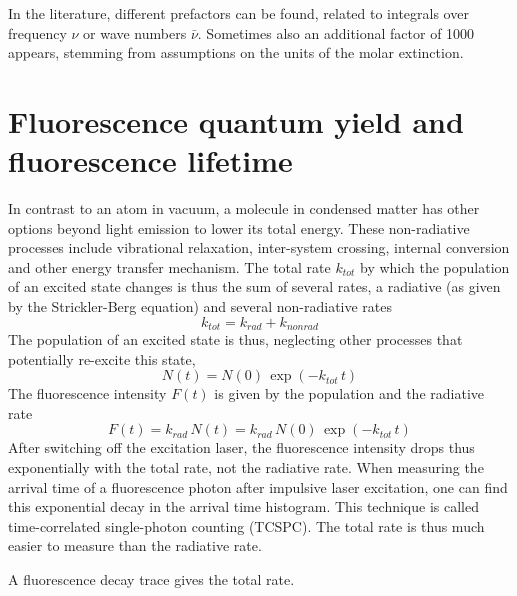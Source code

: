 In the literature, different prefactors can be found, related to integrals over frequency $\nu$ or wave numbers $\bar{\nu}$. Sometimes also an additional factor of 1000 appears, stemming from assumptions on the units of the molar extinction.














\section{Fluorescence quantum yield and fluorescence lifetime} 




In contrast to an atom in vacuum, a molecule in condensed matter has other options beyond light emission to lower its total energy. These non-radiative processes include vibrational relaxation, inter-system crossing, internal conversion and other energy transfer mechanism. The total rate $k_{tot}$ by which the population of an excited state changes is thus the sum of several rates, a radiative  (as given by the Strickler-Berg equation) and several non-radiative rates 
\begin{equation}
 k_{tot} = k_{rad} + k_{non rad} 
\end{equation}
%
The population of an excited state is thus, neglecting other processes that  potentially re-excite this state,
\begin{equation}
 N(t) = N(0) \, \exp \left( - k_{tot}  \,t \right)
\end{equation}
The fluorescence intensity $F(t)$ is given by the population and the radiative rate
\begin{equation}
 F(t) = k_{rad} \, N(t) = k_{rad} \,  N(0) \, \exp \left( - k_{tot} \, t \right)
\end{equation}
After switching off the excitation laser, the fluorescence intensity drops thus exponentially with the total rate, not the radiative rate. When measuring the arrival time of a fluorescence photon after impulsive laser excitation, one can find this exponential decay in the arrival time histogram. This technique is called time-correlated single-photon counting (TCSPC). The total rate is thus much easier to measure than the radiative rate. 


\begin{marginfigure}
  \caption{A fluorescence decay trace gives the total rate.}
\end{marginfigure}


